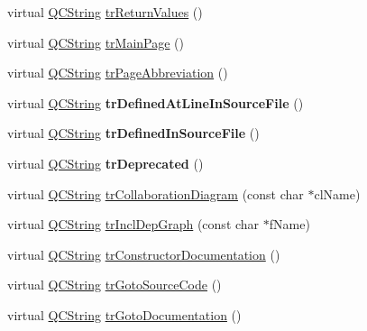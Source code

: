 \begin{DoxyCompactItemize}
\item 
virtual \mbox{\hyperlink{class_q_c_string}{Q\+C\+String}} \mbox{\hyperlink{class_translator_chinesetraditional_a71d32839c4b744f25b05f0e4bdac450c}{tr\+Return\+Values}} ()
\item 
virtual \mbox{\hyperlink{class_q_c_string}{Q\+C\+String}} \mbox{\hyperlink{class_translator_chinesetraditional_a68f8441ce8bc3f508eac1586bb02e249}{tr\+Main\+Page}} ()
\item 
virtual \mbox{\hyperlink{class_q_c_string}{Q\+C\+String}} \mbox{\hyperlink{class_translator_chinesetraditional_a18084cdddd1baa4210092fc99e8f6438}{tr\+Page\+Abbreviation}} ()
\item 
\mbox{\label{class_translator_chinesetraditional_a9170f2a51e8d11640cea5c9be5d5cd2c}} 
virtual \mbox{\hyperlink{class_q_c_string}{Q\+C\+String}} {\bfseries tr\+Defined\+At\+Line\+In\+Source\+File} ()
\item 
\mbox{\label{class_translator_chinesetraditional_ae690faa7b0a64472ce70b374b65b9694}} 
virtual \mbox{\hyperlink{class_q_c_string}{Q\+C\+String}} {\bfseries tr\+Defined\+In\+Source\+File} ()
\item 
\mbox{\label{class_translator_chinesetraditional_aa63a520e54aa78724910fd1c6110f3be}} 
virtual \mbox{\hyperlink{class_q_c_string}{Q\+C\+String}} {\bfseries tr\+Deprecated} ()
\item 
virtual \mbox{\hyperlink{class_q_c_string}{Q\+C\+String}} \mbox{\hyperlink{class_translator_chinesetraditional_a3339f96a2c8696dba9dfb553df59050e}{tr\+Collaboration\+Diagram}} (const char $\ast$cl\+Name)
\item 
virtual \mbox{\hyperlink{class_q_c_string}{Q\+C\+String}} \mbox{\hyperlink{class_translator_chinesetraditional_a040b175f68da5d4dc7efee16a08a634c}{tr\+Incl\+Dep\+Graph}} (const char $\ast$f\+Name)
\item 
virtual \mbox{\hyperlink{class_q_c_string}{Q\+C\+String}} \mbox{\hyperlink{class_translator_chinesetraditional_a2ceebe1beb156a83ed38af7690b732f4}{tr\+Constructor\+Documentation}} ()
\item 
virtual \mbox{\hyperlink{class_q_c_string}{Q\+C\+String}} \mbox{\hyperlink{class_translator_chinesetraditional_afe6478c12591ba06d7f8bc574e42e004}{tr\+Goto\+Source\+Code}} ()
\item 
virtual \mbox{\hyperlink{class_q_c_string}{Q\+C\+String}} \mbox{\hyperlink{class_translator_chinesetraditional_a6f3b8bb891c29f32a1453fc086352735}{tr\+Goto\+Documentation}} ()

\end{DoxyCompactItemize}
